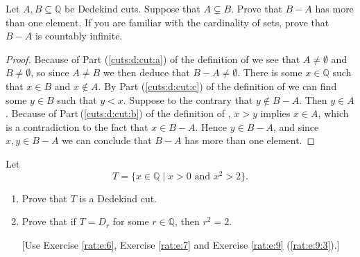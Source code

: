 \Newpage
\begin{exercise} %
	Let $A, B \subseteq \mathbb{Q}$ be Dedekind cuts. Suppose that $A \subsetneq B$. Prove that $B - A$ has more than one element. If you are familiar with the cardinality of sets, prove that $B - A$ is countably infinite.
\end{exercise}

\begin{proof}
	Because of Part (\ref{cuts:d:cut:a}) of the definition of  we see that $A \not= \emptyset$ and $B \not= \emptyset$, so since $A \not= B$ we then deduce that $B - A \not= \emptyset$. There is some $x \in \mathbb{Q}$ such that $x \in B$ and $x \notin A$. By Part (\ref{cuts:d:cut:c}) of the definition of  we can find some $y \in B$ such that $y < x$. Suppose to the contrary that $y \notin B - A$. Then $y \in A$. Because of Part\,(\ref{cuts:d:cut:b}) of the definition of , $x > y$ implies $x \in A$, which is a contradiction to the fact that $x \in B - A$. Hence $y \in B - A$, and since $x, y \in B - A$ we can conclude that $B - A$ has more than one element.
\end{proof}


\Newpage
\begin{exercise} %
	\label{cuts:e:2}
	Let
	$$
		T = \{ x \in \mathbb{Q} \mid x > 0 \text{ and } x^2 > 2 \}.
	$$
	\begin{enumerate}
		\item \label{cuts:e:2:1}
		      Prove that $T$ is a Dedekind cut.
		\item \label{cuts:e:2:2}
		      Prove that if $T = D_r$ for some $r \in \mathbb{Q}$, then $r^2 = 2$.

		      \hfill [Use Exercise \ref{rat:e:6}, Exercise \ref{rat:e:7} and Exercise \ref{rat:e:9} (\ref{rat:e:9:3}).]
	\end{enumerate}
\end{exercise}

